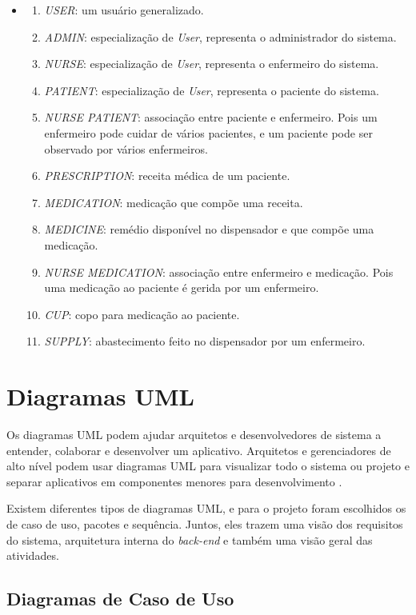 \begin{itemize}
    \item[]
\begin{enumerate}
  \item \emph{USER}: um usuário generalizado.
  \item \emph{ADMIN}: especialização de \emph{User}, representa o administrador do sistema.
  \item \emph{NURSE}: especialização de \emph{User}, representa o enfermeiro do sistema.
  \item \emph{PATIENT}: especialização de \emph{User}, representa o paciente do sistema.
  \item \emph{NURSE PATIENT}: associação entre paciente e enfermeiro. Pois um enfermeiro pode cuidar de vários pacientes, e um paciente pode ser observado por vários enfermeiros.
  \item \emph{PRESCRIPTION}: receita médica de um paciente.
  \item \emph{MEDICATION}: medicação que compõe uma receita.
  \item \emph{MEDICINE}: remédio disponível no dispensador e que compõe uma medicação.
  \item \emph{NURSE MEDICATION}: associação entre enfermeiro e medicação. Pois uma medicação ao paciente é gerida por um enfermeiro.
  \item \emph{CUP}: copo para medicação ao paciente.
  \item \emph{SUPPLY}: abastecimento feito no dispensador por um enfermeiro.
\end{enumerate}
\end{itemize}

\section{Diagramas UML}

Os diagramas UML podem ajudar arquitetos e desenvolvedores de sistema a entender, colaborar e desenvolver um aplicativo. Arquitetos e gerenciadores de alto nível podem usar diagramas UML para visualizar todo o sistema ou projeto e separar aplicativos em componentes menores para desenvolvimento \cite{IBM}.

Existem diferentes tipos de diagramas UML, e para o projeto foram escolhidos os de caso de uso, pacotes e sequência. Juntos, eles trazem uma visão dos requisitos do sistema, arquitetura interna do \emph{back-end} e também uma visão geral das atividades.

\subsection{Diagramas de Caso de Uso}

